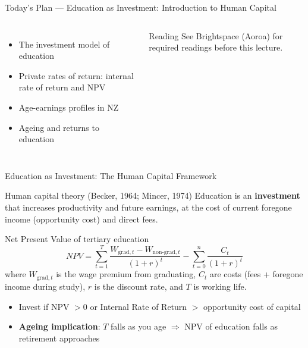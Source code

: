 \documentclass[aspectratio=169, 12pt]{beamer}
\newcommand{\planslide}[2]{%
  \begin{frame}{Today's Plan — #1}
    \begin{columns}
      \column{0.6\textwidth}
      \begin{itemize}#2\end{itemize}
      \column{0.38\textwidth}
      \begin{alertblock}{Reading}
        \footnotesize See Brightspace (Aoroa) for required readings before this lecture.
      \end{alertblock}
    \end{columns}
  \end{frame}}
\begin{document}
\planslide{Education as Investment: Introduction to Human Capital}{
  \item The investment model of education
  \item Private rates of return: internal rate of return and NPV
  \item Age-earnings profiles in NZ
  \item Ageing and returns to education
}

\begin{frame}{Education as Investment: The Human Capital Framework}
  \begin{block}{Human capital theory (Becker, 1964; Mincer, 1974)}
    Education is an \textbf{investment} that increases productivity and future earnings,
    at the cost of current foregone income (opportunity cost) and direct fees.
  \end{block}
  \vspace{0.3em}
  \begin{block}{Net Present Value of tertiary education}
    $$NPV = \sum_{t=1}^{T} \frac{W_{\text{grad},t} - W_{\text{non-grad},t}}{(1+r)^t}
    - \sum_{t=0}^{n} \frac{C_t}{(1+r)^t}$$
    where $W_{\text{grad},t}$ is the wage premium from graduating, $C_t$ are costs
    (fees + foregone income during study), $r$ is the discount rate, and $T$ is working life.
  \end{block}
  \begin{itemize}
    \item Invest if NPV $> 0$ or Internal Rate of Return $>$ opportunity cost of capital
    \item \textbf{Ageing implication}: $T$ falls as you age $\Rightarrow$ NPV of education falls
          as retirement approaches
  \end{itemize}
\end{frame}
\end{document}
